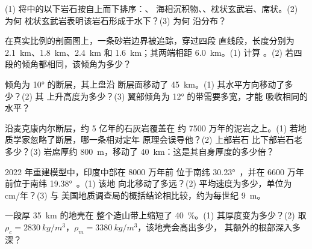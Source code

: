 \begin{exercise}[$\star$]\label{exo:g12:mountain-building:5}
(1) 将中的以下岩石按自上而下排序：、
海相沉积物、、枕状玄武岩、席状。(2) 为何
枕状玄武岩表明该岩石形成于水下？(3) 为何
沿分布？
\end{exercise}

\begin{exercise}[$\star\star$]\label{exo:g12:mountain-building:6}
在真实比例的剖面图上，一条砂岩边界被追踪，穿过四段
直线段，长度分别为 \qty{2.1}{km}、\qty{1.8}{km}、\qty{2.4}{km} 和
\qty{1.6}{km}；其两端相距 \qty{6.0}{km}。(1) 计算
。(2) 若四段的倾角都相同，该倾角为多少？
\end{exercise}

\begin{exercise}[$\star\star$]\label{exo:g12:mountain-building:7}
倾角为 \ang{10} 的断层，其上盘沿
断层面移动了 \qty{45}{km}。(1) 其水平方向移动了多少？(2) 其
上升高度为多少？(3) 翼部倾角为 \ang{12} 的带需要多宽，才能
吸收相同的水平？
\end{exercise}

\begin{exercise}[$\star\star$]\label{exo:g12:mountain-building:8}
沿麦克康内尔断层，约 5 亿年的石灰岩覆盖在
约 7500 万年的泥岩之上。(1) 若地质学家忽略了断层，哪一条相对定年
原理会误导他？(2) 上部岩石
比下部岩石老多少？(3) 岩席厚约 \qty{800}{m}，移动了
\qty{40}{km}：这是其自身厚度的多少倍？
\end{exercise}

\begin{exercise}[$\star\star$]\label{exo:g12:mountain-building:9}
2022 年重建模型中，印度中部在 8000 万年前
位于南纬 \ang{30.23}~，并在 6600 万年前位于南纬 \ang{19.38}~。(1) 该地
向北移动了多远？(2) 平均速度为多少，单位为 \unit{cm}/年？(3) 与
美国地质调查局的概括结论相比较，约为每世纪 \qty{9}{m}。
\end{exercise}

\begin{exercise}[$\star\star$]\label{exo:g12:mountain-building:10}
一段厚 \qty{35}{km} 的地壳在
整个造山带上缩短了 \qty{40}{\percent}。(1) 其厚度变为多少？(2) 取 $\rho_c =
\qty{2830}{kg/m^3}$，$\rho_m = \qty{3380}{kg/m^3}$，该地壳会高出多少，
其额外的根部深入多深？
\end{exercise}

